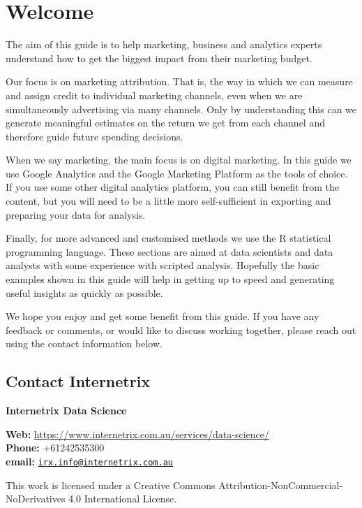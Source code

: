 \documentclass[]{book}
\begin{document}
{
\setcounter{tocdepth}{1}
\tableofcontents
}
\chapter{Welcome}\label{welcome}

The aim of this guide is to help marketing, business and analytics
experts understand how to get the biggest impact from their marketing
budget.

Our focus is on marketing attribution. That is, the way in which we can
measure and assign credit to individual marketing channels, even when we
are simultaneously advertising via many channels. Only by understanding
this can we generate meaningful estimates on the return we get from each
channel and therefore guide future spending decisions.

When we say marketing, the main focus is on digital marketing. In this
guide we use Google Analytics and the Google Marketing Platform as the
tools of choice. If you use some other digital analytics platform, you
can still benefit from the content, but you will need to be a little
more self-sufficient in exporting and preparing your data for analysis.

Finally, for more advanced and customised methods we use the R
statistical programming language. These sections are aimed at data
scientists and data analysts with some experience with scripted
analysis. Hopefully the basic examples shown in this guide will help in
getting up to speed and generating useful insights as quickly as
possible.

We hope you enjoy and get some benefit from this guide. If you have any
feedback or comments, or would like to discuss working together, please
reach out using the contact information below.

\section{Contact Internetrix}\label{contact-internetrix}

\textbf{Internetrix Data Science}

\textbf{Web:}
\url{https://www.internetrix.com.au/services/data-science/}\\
\textbf{Phone:} +61242535300\\
\textbf{email:}
\href{mailto:irx.info@internetrix.com.au}{\nolinkurl{irx.info@internetrix.com.au}}

This work is licensed under a Creative Commons
Attribution-NonCommercial-NoDerivatives 4.0 International License.
\end{document}
